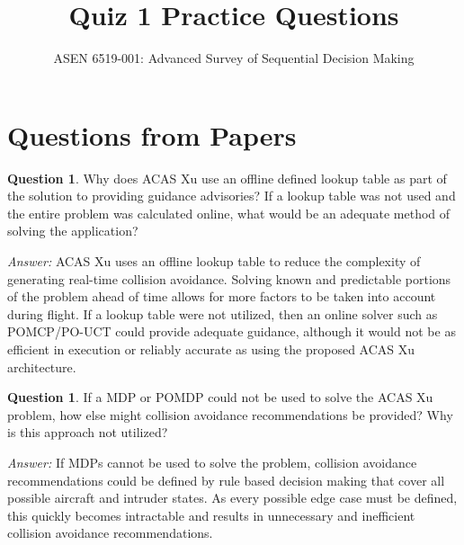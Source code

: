 \documentclass{article}
\title{Quiz 1 Practice Questions}
\author{ASEN 6519-001: Advanced Survey of Sequential Decision Making}
\theoremstyle{definition}
\newtheorem{question}[thm]{Question}
\newenvironment{answer}{\noindent\textit{Answer:}}{}
\begin{document}
\maketitle

\section{Questions from Papers}

\begin{question}
Why does ACAS Xu use an offline defined lookup table as part of the solution to providing guidance advisories? If a lookup table was not used and the entire problem was calculated online, what would be an adequate method of solving the application?
\end{question}

\begin{answer}
ACAS Xu uses an offline lookup table to reduce the complexity of generating real-time collision avoidance. Solving known and predictable portions of the problem ahead of time allows for more factors to be taken into account during flight. If a lookup table were not utilized, then an online solver such as POMCP/PO-UCT could provide adequate guidance, although it would not be as efficient in execution or reliably accurate as using the proposed ACAS Xu architecture.
\end{answer}

\begin{question}
If a MDP or POMDP could not be used to solve the ACAS Xu problem, how else might collision avoidance recommendations be provided? Why is this approach not utilized?
\end{question}

\begin{answer}
If MDPs cannot be used to solve the problem, collision avoidance recommendations could be defined by rule based decision making that cover all possible aircraft and intruder states. As every possible edge case must be defined, this quickly becomes intractable and results in unnecessary and inefficient collision avoidance recommendations.    
\end{answer}
\end{document}
